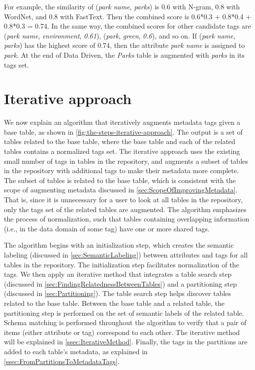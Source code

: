 For example, the similarity of (\textit{park name}, \textit{parks}) is 0.6 with N-gram, 0.8 with WordNet, and 0.8 with FastText. Then the combined score is 0.6*0.3 + 0.8*0.4 + 0.8*0.3 = 0.74. In the same way, the combined scores for other candidate tags are (\textit{park name}, \textit{environment}, \textit{0.61}), (\textit{park}, \textit{green}, \textit{0.6}), and so on. If (\textit{park name}, \textit{parks}) has the highest score of 0.74, then the attribute \textit{park name} is assigned to \textit{park}. At the end of Data Driven, the \textit{Parks} table is augmented with \textit{parks} in its tags set.

\section{Iterative approach}
\label{sec:IterativeApproach}

We now explain an algorithm that iteratively augments metadata tags given a base table, as shown in \autoref{fig:the-steps-iterative-approach}. The output is a set of tables related to the base table, where the base table and each of the related tables contains a normalized tags set. The iterative approach uses the existing small number of tags in tables in the repository, and augments a subset of tables in the repository with additional tags to make their metadata more complete. The subset of tables is related to the base table, which is consistent with the scope of augmenting metadata discussed in \autoref{sec:ScopeOfImprovingMetadata}. That is, since it is unnecessary for a user to look at all tables in the repository, only the tags set of the related tables are augmented. The algorithm emphasizes the process of normalization, such that tables containing overlapping information (i.e., in the data domain of some tag) have one or more shared tags.

The algorithm begins with an initialization step, which creates the semantic labeling (discussed in \autoref{sec:SemanticLabeling}) between attributes and tags for all tables in the repository. The initialization step facilitates normalization of the tags. We then apply an iterative method that integrates a table search step (discussed in \autoref{sec:FindingRelatednessBetweenTables}) and a partitioning step (discussed in \autoref{sec:Partitioning}). The table search step helps discover tables related to the base table. Between the base table and a related table, the partitioning step is performed on the set of semantic labels of the related table. Schema matching is performed throughout the algorithm to verify that a pair of items (either attribute or tag) correspond to each other. The iterative method will be explained in \autoref{ssec:IterativeMethod}. Finally, the tags in the partitions are added to each table's metadata, as explained in \autoref{ssec:FromPartitionsToMetadataTags}.

